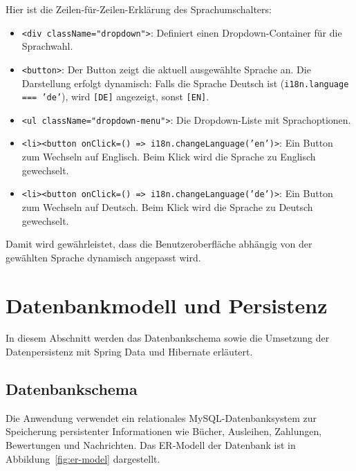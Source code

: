 \noindent Hier ist die Zeilen-für-Zeilen-Erklärung des Sprachumschalters:
\begin{itemize}
	\item \texttt{\textless{}div className="dropdown"\textgreater{}}: Definiert einen Dropdown-Container für die Sprachwahl.
	\item \texttt{\textless{}button\textgreater{}}: Der Button zeigt die aktuell ausgewählte Sprache an.  
	Die Darstellung erfolgt dynamisch: Falls die Sprache Deutsch ist (\texttt{i18n.language === 'de'}), wird \texttt{[DE]} angezeigt, sonst \texttt{[EN]}.
	\item \texttt{\textless{}ul className="dropdown-menu"\textgreater{}}: Die Dropdown-Liste mit Sprachoptionen.
	\item \texttt{\textless{}li\textgreater{}\textless{}button onClick={() => i18n.changeLanguage('en')}\textgreater{}}: Ein Button zum Wechseln auf Englisch. Beim Klick wird die Sprache zu Englisch gewechselt.
	\item \texttt{\textless{}li\textgreater{}\textless{}button onClick={() => i18n.changeLanguage('de')}\textgreater{}}: Ein Button zum Wechseln auf Deutsch. Beim Klick wird die Sprache zu Deutsch gewechselt.
\end{itemize}

\noindent Damit wird gewährleistet, dass die Benutzeroberfläche abhängig von der gewählten Sprache dynamisch angepasst wird.

\section{Datenbankmodell und Persistenz}
In diesem Abschnitt werden das Datenbankschema sowie die Umsetzung der Datenpersistenz mit Spring Data und Hibernate erläutert.

\subsection{Datenbankschema}

Die Anwendung verwendet ein relationales MySQL-Datenbanksystem zur Speicherung persistenter Informationen wie Bücher, Ausleihen, Zahlungen, Bewertungen und Nachrichten. Das ER-Modell der Datenbank ist in Abbildung~\ref{fig:er-model} dargestellt.


